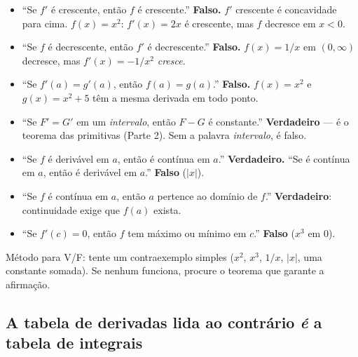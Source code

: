\begin{armadilha}
\begin{itemize}[leftmargin=1.4em, itemsep=2pt]
\item ``Se $f'$ é crescente, então $f$ é crescente.'' \textbf{Falso.} $f'$ crescente é concavidade para cima. $f(x)=x^2$: $f'(x)=2x$ é crescente, mas $f$ decresce em $x<0$.
\item ``Se $f$ é decrescente, então $f'$ é decrescente.'' \textbf{Falso.} $f(x)=1/x$ em $(0,\infty)$ decresce, mas $f'(x)=-1/x^2$ \emph{cresce}.
\item ``Se $f'(a)=g'(a)$, então $f(a)=g(a)$.'' \textbf{Falso.} $f(x)=x^2$ e $g(x)=x^2+5$ têm a mesma derivada em todo ponto.
\item ``Se $F'=G'$ em um \emph{intervalo}, então $F-G$ é constante.'' \textbf{Verdadeiro} --- é o teorema das primitivas (Parte 2). Sem a palavra \emph{intervalo}, é falso.
\item ``Se $f$ é derivável em $a$, então é contínua em $a$.'' \textbf{Verdadeiro.} ``Se é contínua em $a$, então é derivável em $a$.'' \textbf{Falso} ($|x|$).
\item ``Se $f$ é contínua em $a$, então $a$ pertence ao domínio de $f$.'' \textbf{Verdadeiro}: continuidade exige que $f(a)$ exista.
\item ``Se $f'(c)=0$, então $f$ tem máximo ou mínimo em $c$.'' \textbf{Falso} ($x^3$ em $0$).
\end{itemize}
Método para V/F: tente um contraexemplo simples ($x^2$, $x^3$, $1/x$, $|x|$, uma constante somada). Se nenhum funciona, procure o teorema que garante a afirmação.
\end{armadilha}

\subsection{A tabela de derivadas lida ao contrário \emph{é} a tabela de integrais}

